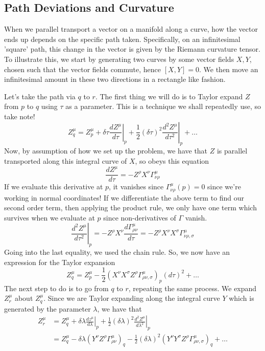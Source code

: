 \subsection{Path Deviations and Curvature} 

When we parallel transport a vector on a manifold along 
a curve, how the vector ends up
depends on the specific path taken. Specifically, 
on an infinitesimal 'square' path, this 
change in the vector is given by the Riemann 
curvature tensor. To illustrate this, 
we start by generating two curves by some vector 
fields $X, Y $, chosen such that the vector fields 
commute, hence $ [ X, Y ] = 0 $.  
We then move an infinitesimal amount in these two directions 
in a rectangle like fashion.

Let's take the path via $ q $ to  $ r$. 
The first thing we will do is to Taylor expand 
 $ Z $ from $ p $ to $q $ using $ \tau $ as a parameter. 
 This is a technique we shall repeatedly use, so take note!
 \[
  Z_ q ^ \mu = Z_ p ^ \mu + \delta \tau \left. \frac{ d Z ^ \mu }{ d \tau }
	  \right\vert_{ p } + \frac{1}{2 }( \delta \tau ) ^ 2 \left. \frac{ d ^ 2 Z ^ \mu }{ 
	  d \tau ^ 2 } \right\vert_{ p} + \dots 
 \] Now, by assumption of how we set up the 
 problem, we have that $ Z $ is parallel transported 
 along this integral curve of $ X  $, so obeys this equation 
 \[
  \frac{ d Z ^ \mu }{ d \tau } = - Z ^ \rho X ^ \nu \Gamma^ \mu _{ \nu \rho }
 \] If we evaluate this derivative at $ p $, it 
 vanishes since $ \Gamma ^ \mu _{ \nu \rho } ( p ) = 0 $ 
 since we're working in normal coordinates! 
 If we differentiate the above term to find our second order 
 term, then applying the product rule, we only have 
 one term which survives when we evaluate at $ p  $ since
 non-derivatives of $ \Gamma $ vanish. 
 \[
 \left.  \frac{ d ^ 2 Z ^ \mu }{ d \tau ^ 2} \right\vert_p = 
	  - Z^ \rho X ^ \nu \frac{d \Gamma^ \mu _{ \rho \nu } }{ d \tau }  = 
	  -  Z ^ \rho X ^ \nu X ^ \sigma \Gamma ^ \mu _{ \nu \rho , \sigma}
 \] Going into the last equality, 
 we used the chain rule. So, we now have an 
 expression for the Taylor expansion 
 \[
	 Z _ q ^ \mu = Z_ p ^ \mu - \frac{1}{2 } \left( X ^ \nu X ^ \sigma Z ^ \rho 
	 \Gamma ^ \mu _{ \rho \nu , \sigma  }\right)_p ( d \tau ) ^ 2 + \dots   
 \]  The next step to do is to 
 go from $ q $ to $ r $, repeating the same process. We 
 expand  $ Z_r ^ \mu $ about $ Z _ q ^ \mu $. Since 
 we are Taylor expanding along the integral curve 
 $ Y $ which is generated by the parameter $ \lambda $, 
 we have that 
 \begin{align*}
	 Z^\mu _ r &=  Z ^ \mu _ q +  \delta \lambda \left. \frac{d z ^ \mu }{ d \lambda } \right\vert_{ p } + \frac{1}{2 } ( \delta \lambda ) ^ 2 \left. \frac{d ^ 2 Z ^ \mu }{ d \lambda ^ 2 } \right\vert_{ p } \\
		   &=  Z ^ \mu _ q - \delta \lambda ( Y ^ \nu  Z^ \rho \Gamma ^ \mu _{ \rho \nu } )_ q  - \frac{1}{2 } ( \delta \lambda ) ^2 ( Y ^ \nu Y ^ \sigma Z ^ \rho \Gamma^ \mu 
		   _{ \rho \nu , \sigma } ) _ q + \dots\\
 \end{align*}
